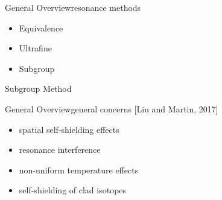 \documentclass[sans,mathserif,aspectratio=169, 10pt]{beamer}
\begin{document}
\begin{frame}{General Overview}{resonance methods}
\begin{itemize}
\item<1> Equivalence 
\item<2> Ultrafine
\item<3> Subgroup
\end{itemize}
\end{frame}

\begin{frame}{Subgroup Method}
\centering
{}
\end{frame}

\begin{frame}{General Overview}{general concerns [Liu and Martin, 2017]}
\begin{itemize}
\item<1> spatial self-shielding effects 
\item<2> resonance interference
\item<3> non-uniform temperature effects
\item<4-> self-shielding of clad isotopes
\end{itemize}
\end{frame}
\end{document}
